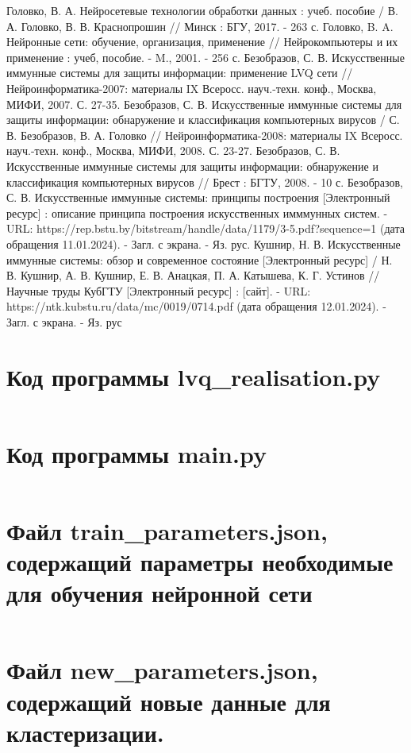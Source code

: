 \documentclass[bachelor, och, referat]{template}
\begin{document}
\begin{thebibliography}{15}
    Головко, В. А. Нейросетевые технологии обработки данных : учеб. пособие / В. А. Головко, В. В. Краснопрошин // Минск : БГУ,
    2017. - 263 с.
    Головко, B. A. Нейронные сети: обучение, организация, применение // Нейрокомпью­теры и их применение : учеб, пособие. - M., 2001. - 256 с.
    Безобразов, С. В. Искусственные иммунные системы для защиты информации: при­менение LVQ сети // Нейроинформатика-2007: 
    материалы IX Всеросс. науч.-техн. конф., Москва, МИФИ, 2007. С. 27-35.
    Безобразов, С. В. Искусственные иммунные системы для защиты информации: обнаружение и классификация компьютерных вирусов /
    С. В. Безобразов, В. А. Головко // Нейроинформатика-2008: материалы IX Всеросс. науч.-техн. конф., Москва, МИФИ, 2008. С. 23-27.
    Безобразов, С. В. Искусственные иммунные системы для защиты информации: обнаружение и классификация компьютерных вирусов //
    Брест : БГТУ, 2008. - 10 с.
    Безобразов, С. В. Искусственные иммунные системы: принципы построения [Электронный ресурс] : описание принципа построения
    искусственных имммунных систем. - URL: https://rep.bstu.by/bitstream/handle/data/1179/3-5.pdf?sequence=1 (дата обращения 11.01.2024). -
    Загл. с экрана. - Яз. рус.
    Кушнир, Н. В. Искусственные иммунные системы: обзор и современное состояние [Электронный ресурс] / Н. В. Кушнир, А. В. Кушнир,
    Е. В. Анацкая, П. А. Катышева, К. Г. Устинов // Научные труды КубГТУ [Электронный ресурс] : [сайт]. - URL: https://ntk.kubstu.ru/data/mc/0019/0714.pdf 
    (дата обращения 12.01.2024). - Загл. с экрана. - Яз. рус


\end{thebibliography}

\appendix

    \section{Код программы lvq\_realisation.py}
    \inputminted[fontsize=\small]{python3}{code/lvq_realisation.py}

    \section{Код программы main.py}
    \inputminted[fontsize=\small]{python3}{code/main.py}
    
    \section{Файл train\_parameters.json, содержащий параметры необходимые для обучения нейронной сети}
    \inputminted[fontsize=\small]{JSON}{code/train_parameters.json}
    
    \section{Файл new\_parameters.json, содержащий новые данные для кластеризации.}
    \inputminted[fontsize=\small]{JSON}{code/new_parameters.json}
\end{document}
